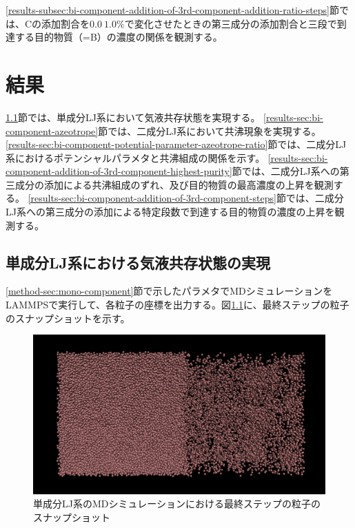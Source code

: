 \documentclass[titlepage]{jsreport}
\begin{document}
\ref{results-subsec:bi-component-addition-of-3rd-component-addition-ratio-steps}節では、Cの添加割合を$0.0~1.0\%$で変化させたときの第三成分の添加割合と三段で到達する目的物質（=B）の濃度の関係を観測する。


\chapter{結果} \label{chap:results}
\ref{results-sec:mono-component}節では、単成分LJ系において気液共存状態を実現する。
\ref{results-sec:bi-component-azeotrope}節では、二成分LJ系において共沸現象を実現する。
\ref{results-sec:bi-component-potential-parameter-azeotrope-ratio}節では、二成分LJ系におけるポテンシャルパラメタと共沸組成の関係を示す。
\ref{results-sec:bi-component-addition-of-3rd-component-highest-purity}節では、二成分LJ系への第三成分の添加による共沸組成のずれ、及び目的物質の最高濃度の上昇を観測する。
\ref{results-sec:bi-component-addition-of-3rd-component-steps}節では、二成分LJ系への第三成分の添加による特定段数で到達する目的物質の濃度の上昇を観測する。

\section{単成分LJ系における気液共存状態の実現} \label{results-sec:mono-component}
\ref{method-sec:mono-component}節で示したパラメタでMDシミュレーションをLAMMPSで実行して、各粒子の座標を出力する。図\ref{fig:ln78732-rn10976-ld0.629856-rd0.087808-last}に、最終ステップの粒子のスナップショットを示す。
\begin{figure}[htbp]
    \begin{center}
        \includegraphics[width=14cm]{fig/ln78732-rn10976-ld0.629856-rd0.087808/ln78732-rn10976-ld0.629856-rd0.087808-last.png}
    \end{center}
    \caption{単成分LJ系のMDシミュレーションにおける最終ステップの粒子のスナップショット}
    \label{fig:ln78732-rn10976-ld0.629856-rd0.087808-last}
\end{figure}
\end{document}
